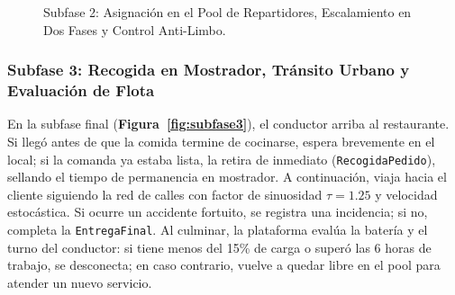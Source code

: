 \documentclass[11pt,a4paper]{article}
\begin{document}
\begin{figure}[htbp]
{%
}
\caption{Subfase 2: Asignación en el Pool de Repartidores, Escalamiento en Dos Fases y Control Anti-Limbo.}
\label{fig:subfase2}
\end{figure}

\subsubsection{Subfase 3: Recogida en Mostrador, Tránsito Urbano y Evaluación de Flota}
En la subfase final (\textbf{Figura~\ref{fig:subfase3}}), el conductor arriba al restaurante. Si llegó antes de que la comida termine de cocinarse, espera brevemente en el local; si la comanda ya estaba lista, la retira de inmediato (\texttt{RecogidaPedido}), sellando el tiempo de permanencia en mostrador. A continuación, viaja hacia el cliente siguiendo la red de calles con factor de sinuosidad $\tau = 1.25$ y velocidad estocástica. Si ocurre un accidente fortuito, se registra una incidencia; si no, completa la \texttt{EntregaFinal}. Al culminar, la plataforma evalúa la batería y el turno del conductor: si tiene menos del 15\% de carga o superó las 6 horas de trabajo, se desconecta; en caso contrario, vuelve a quedar libre en el pool para atender un nuevo servicio.
\end{document}
